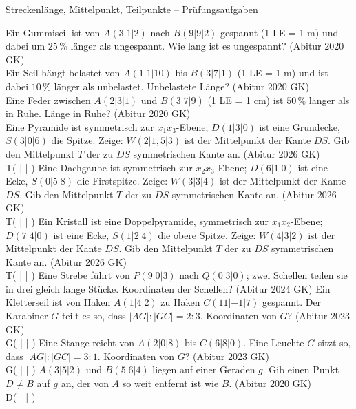 \begin{aufgabe}{Streckenlänge, Mittelpunkt, Teilpunkte – Prüfungsaufgaben}
\begin{teile}
\teil Ein Gummiseil ist von $A(3 | 1 | 2)$ nach $B(9 | 9 | 2)$ gespannt (1 LE = 1 m) und dabei um $25\,\%$ länger als ungespannt. Wie lang ist es ungespannt? \hfill (Abitur 2020 GK) \\ \leerfeld[m]
\teil Ein Seil hängt belastet von $A(1 | 1 | 10)$ bis $B(3 | 7 | 1)$ (1 LE = 1 m) und ist dabei $10\,\%$ länger als unbelastet. Unbelastete Länge? \hfill (Abitur 2020 GK) \\ \leerfeld[m]
\teil Eine Feder zwischen $A(2 | 3 | 1)$ und $B(3 | 7 | 9)$ (1 LE = 1 cm) ist $50\,\%$ länger als in Ruhe. Länge in Ruhe? \hfill (Abitur 2020 GK) \\ \leerfeld[cm]
\teil Eine Pyramide ist symmetrisch zur $x_1x_3$-Ebene; $D(1 | 3 | 0)$ ist eine Grundecke, $S(3 | 0 | 6)$ die Spitze. Zeige: $W(2 | 1{,}5 | 3)$ ist der Mittelpunkt der Kante $DS$. Gib den Mittelpunkt $T$ der zu $DS$ symmetrischen Kante an. \hfill (Abitur 2026 GK) \\ T( \leerfeld | \leerfeld | \leerfeld )
\teil Eine Dachgaube ist symmetrisch zur $x_2x_3$-Ebene; $D(6 | 1 | 0)$ ist eine Ecke, $S(0 | 5 | 8)$ die Firstspitze. Zeige: $W(3 | 3 | 4)$ ist der Mittelpunkt der Kante $DS$. Gib den Mittelpunkt $T$ der zu $DS$ symmetrischen Kante an. \hfill (Abitur 2026 GK) \\ T( \leerfeld | \leerfeld | \leerfeld )
\teil Ein Kristall ist eine Doppelpyramide, symmetrisch zur $x_1x_2$-Ebene; $D(7 | 4 | 0)$ ist eine Ecke, $S(1 | 2 | 4)$ die obere Spitze. Zeige: $W(4 | 3 | 2)$ ist der Mittelpunkt der Kante $DS$. Gib den Mittelpunkt $T$ der zu $DS$ symmetrischen Kante an. \hfill (Abitur 2026 GK) \\ T( \leerfeld | \leerfeld | \leerfeld )
\teil Eine Strebe führt von $P(9 | 0 | 3)$ nach $Q(0 | 3 | 0)$; zwei Schellen teilen sie in drei gleich lange Stücke. Koordinaten der Schellen? \hfill (Abitur 2024 GK)
\teil Ein Kletterseil ist von Haken $A(1 | 4 | 2)$ zu Haken $C(11 | -1 | 7)$ gespannt. Der Karabiner $G$ teilt es so, dass $|AG| : |GC| = 2 : 3$. Koordinaten von $G$? \hfill (Abitur 2023 GK) \\ G( \leerfeld | \leerfeld | \leerfeld )
\teil Eine Stange reicht von $A(2 | 0 | 8)$ bis $C(6 | 8 | 0)$. Eine Leuchte $G$ sitzt so, dass $|AG| : |GC| = 3 : 1$. Koordinaten von $G$? \hfill (Abitur 2023 GK) \\ G( \leerfeld | \leerfeld | \leerfeld )
\teil $A(3 | 5 | 2)$ und $B(5 | 6 | 4)$ liegen auf einer Geraden $g$. Gib einen Punkt $D \ne B$ auf $g$ an, der von $A$ so weit entfernt ist wie $B$. \hfill (Abitur 2020 GK) \\ D( \leerfeld | \leerfeld | \leerfeld )

\end{teile}
\end{aufgabe}
